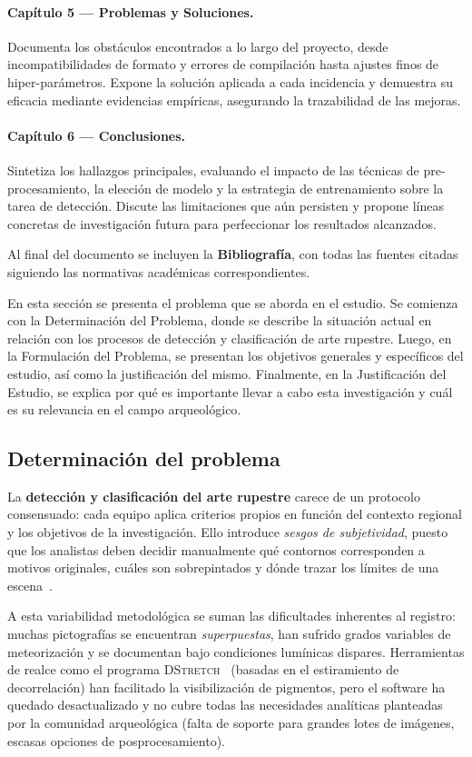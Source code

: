 \paragraph{Capítulo 5 — Problemas y Soluciones.}
Documenta los obstáculos encontrados a lo largo del proyecto, desde incompatibilidades de formato y errores de compilación hasta ajustes finos de hiper-parámetros.
Expone la solución aplicada a cada incidencia y demuestra su eficacia mediante evidencias empíricas, asegurando la trazabilidad de las mejoras.

\paragraph{Capítulo 6 — Conclusiones.}
Sintetiza los hallazgos principales, evaluando el impacto de las técnicas de pre-procesamiento, la elección de modelo y la estrategia de entrenamiento sobre la tarea de detección.
Discute las limitaciones que aún persisten y propone líneas concretas de investigación futura para perfeccionar los resultados alcanzados.

\bigskip
Al final del documento se incluyen la \textbf{Bibliografía}, con todas las fuentes citadas siguiendo las normativas académicas correspondientes.

En esta sección se presenta el problema que se aborda en el estudio.
Se comienza con la Determinación del Problema, donde se describe la situación actual en relación con los procesos de detección y clasificación de arte rupestre.
Luego, en la Formulación del Problema, se presentan los objetivos generales y específicos del estudio, así como la justificación del mismo.
Finalmente, en la Justificación del Estudio, se explica por qué es importante llevar a cabo esta investigación y cuál es su relevancia en el campo arqueológico.

\subsection{Determinación del problema}

La \textbf{detección y clasificación del arte rupestre} carece de un protocolo consensuado: cada equipo aplica criterios propios en función del contexto regional y los objetivos de la investigación.
Ello introduce \emph{sesgos de subjetividad}, puesto que los analistas deben decidir manualmente qué contornos corresponden a motivos originales, cuáles son sobrepintados y dónde trazar los límites de una escena~\cite{aschero2012}.

A esta variabilidad metodológica se suman las dificultades inherentes al registro: muchas pictografías se encuentran \emph{superpuestas}, han sufrido grados variables de meteorización y se documentan bajo condiciones lumínicas dispares.
Herramientas de realce como el programa \textsc{DStretch}~\cite{dstretch} (basadas en el estiramiento de decorrelación) han facilitado la visibilización de pigmentos, pero el software ha quedado desactualizado y no cubre todas las necesidades analíticas planteadas por la comunidad arqueológica (falta de soporte para grandes lotes de imágenes, escasas opciones de posprocesamiento).

